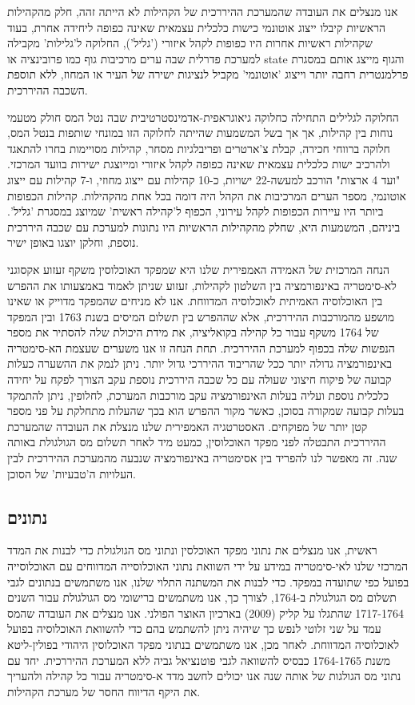 אנו מנצלים את העובדה שהמערכת ההיררכית של הקהילות לא הייתה זהה, חלק מהקהילות הראשיות קיבלו ייצוג אוטונמי כישות כלכלית עצמאית שאינה כפופה ליחידה אחרת, בעוד שקהילות ראשיות אחרות היו כפופות לקהל איזורי ('גליל'),  החלוקה ל'גלילות' מקבילה למערכת פדרלית שבה ערים מרכיבות גוף כמו פרובינציה או state והגוף מייצג אותם במסגרת פרלמנטרית רחבה יותר וייצוג 'אוטונמי' מקביל לנציגות ישירה של העיר או המחוז, ללא תוספת השכבה ההיררכית. 

החלוקה לגלילים התחילה כחלוקה גיאוגראפית-אדמינסטרטיבית שבה נטל המס חולק מטעמי נוחות בין קהילות, אך אך בשל המשמעות שהייתה לחלוקה הזו במונחי שותפות בנטל המס, חלוקה ברווחי חכירה, קבלת צ'ארטרים ופריבלגיות מסחר, קהילות מסויימות בחרו להתאגד ולהרכיב ישות כלכלית עצמאית שאינה כפופה לקהל איזורי ומייוצגת ישירות בוועד המרכזי. "ועד 4 ארצות" הורכב למעשה-22 ישויות, כ-10 קהילות עם ייצוג מחוזי, ו-7 קהילות עם ייצוג אוטונמי, מספר הערים המרכיבות את הקהל היה דומה בכל אחת מהקהילות. קהילות הכפופות ביותר היו עיירות הכפופות לקהל עירוני, הכפוף ל'קהילה ראשית' שמיוצג במסגרת 'גליל'. ביניהם,  המשמעות היא, שחלק מהקהילות הראשיות היו נתונות למערכת עם שכבה היררכית נוספת, וחלקן יוצגו באופן ישיר.

הנחה המרכזית של האמידה האמפירית שלנו היא שמפקד האוכלוסין משקף זעזוע אקסוגני לא-סימטריה באינפורמציה בין השלטון לקהילות, זעזוע שניתן לאמוד באמצעותו את ההפרש בין האוכלוסיה האמיתית לאוכלוסיה המדווחת. אנו לא מניחים שהמפקד מדוייק או שאינו מושפע מהמורכבות ההיררכית, אלא  שההפרש בין תשלום המיסים בשנת 1763 ובין המפקד של 1764 משקף עבור כל קהילה בקואליציה, את מידת היכולת שלה להסתיר את מספר הנפשות שלה בכפוף למערכת ההיררכית. תחת הנחה זו אנו משערים שעצמת הא-סימטריה באינפורמציה גדולה יותר ככל שהריבוד ההיררכי גדול יותר. ניתן לנמק את ההשערה כעלות קבועה של פיקוח חיצוני שעולה עם כל שכבה היררכית נוספת עקב הצורך לפקח על יחידה כלכלית נוספת ועליה בעלות האינפורמציה עקב מורכבות המערכת, לחלופין, ניתן להתמקד בעלות קבועה שמקורה בסוכן, כאשר מקור ההפרש הוא בכך שהעלות מתחלקת על פני מספר קטן יותר של מפוקחים. האסטרטגיה האמפירית שלנו מנצלת את העובדה שהמערכת ההיררכית התבטלה לפני מפקד האוכלוסין, כמעט מיד לאחר תשלום מס הגולגולת באותה שנה. זה מאפשר לנו להפריד בין אסימטריה באינפורמציה שנבעה מהמערכת ההיררכית לבין העלויות ה'טבעיות' של הסוכן.









\subsection{נתונים}
ראשית, אנו מנצלים את נתוני מפקד האוכלסין ונתוני מס הגולגולת כדי לבנות את המדד המרכזי שלנו לאי-סימטריה במידע על ידי השוואת נתוני האוכלוסייה המדווחים עם האוכלוסייה בפועל כפי שתועדה במפקד.
כדי לבנות את המשתנה התלוי שלנו, אנו משתמשים בנתונים לגבי תשלום מס הגולגולת ב-1764, לצורך כך, אנו משתמשים ברישומי מס הגולגולת עבור השנים 1717-1764 שהתגלו על קליק (2009) בארכיון האוצר הפולני. אנו מנצלים את העובדה שהמס עמד על שני זלוטי לנפש כך שיהיה ניתן להשתמש בהם כדי להשוואת האוכלוסיה בפועל לאוכלוסיה המדווחת.
לאחר מכן, אנו משתמשים בנתוני מפקד האוכלוסין היהודי בפולין-ליטא משנת 1764-1765 כבסיס להשוואה לגבי פוטנציאל גביה ללא המערכת ההיררכית. יחד עם נתוני מס הגולגות של אותה שנה אנו יכולים לחשב מדד א-סימטריה עבור כל קהילה ולהעריך את היקף הדיווח החסר של מערכת הקהילות.

